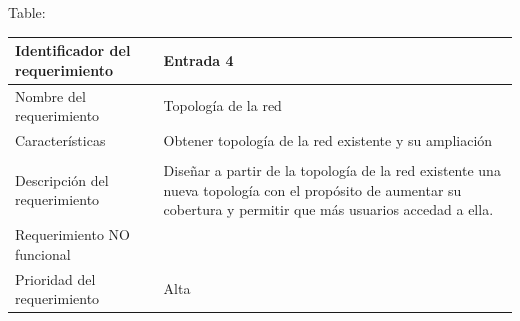 \documentclass[]{article}
\begin{document}
Table:

\begin{longtable}[]{@{}ll@{}}
\toprule
\begin{minipage}[b]{0.39\columnwidth}\raggedright\strut
Identificador del requerimiento\strut
\end{minipage} & \begin{minipage}[b]{0.50\columnwidth}\raggedright\strut
Entrada 4\strut
\end{minipage}\tabularnewline
\midrule
\endhead
\begin{minipage}[t]{0.39\columnwidth}\raggedright\strut
Nombre del requerimiento\strut
\end{minipage} & \begin{minipage}[t]{0.50\columnwidth}\raggedright\strut
Topología de la red\strut
\end{minipage}\tabularnewline
\begin{minipage}[t]{0.39\columnwidth}\raggedright\strut
Características\strut
\end{minipage} & \begin{minipage}[t]{0.50\columnwidth}\raggedright\strut
Obtener topología de la red existente y su ampliación\strut
\end{minipage}\tabularnewline
\begin{minipage}[t]{0.39\columnwidth}\raggedright\strut
\strut
\end{minipage}\tabularnewline
\begin{minipage}[t]{0.39\columnwidth}\raggedright\strut
Descripción del requerimiento\strut
\end{minipage} & \begin{minipage}[t]{0.50\columnwidth}\raggedright\strut
Diseñar a partir de la topología de la red existente una nueva topología
con el propósito de aumentar su cobertura y permitir que más usuarios
accedad a ella.\strut
\end{minipage}\tabularnewline
\begin{minipage}[t]{0.39\columnwidth}\raggedright\strut
Requerimiento NO funcional\strut
\end{minipage} & \begin{minipage}[t]{0.50\columnwidth}\raggedright\strut
\strut
\end{minipage}\tabularnewline
\begin{minipage}[t]{0.39\columnwidth}\raggedright\strut
Prioridad del requerimiento\strut
\end{minipage} & \begin{minipage}[t]{0.50\columnwidth}\raggedright\strut
Alta\strut
\end{minipage}\tabularnewline
\bottomrule
\end{longtable}
\end{document}
